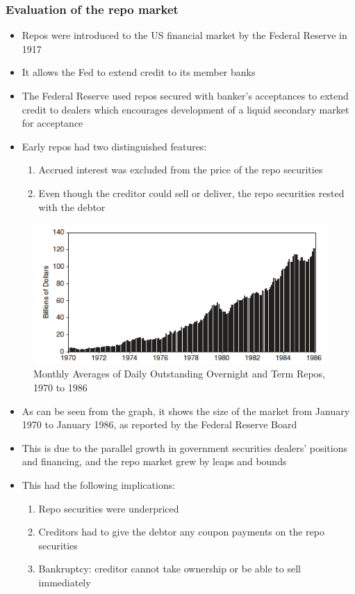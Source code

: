 \documentclass[11pt]{beamer}
\begin{document}
\begin{frame}
\frametitle{Evaluation of the repo market}
\begin{itemize}
\item Repos were introduced to the US financial market by the Federal Reserve in 1917
\item It allows the Fed to extend credit to its member banks
\item The Federal Reserve used repos secured with banker's acceptances to extend credit to dealers which encourages development of a liquid secondary market for acceptance
\item Early repos had two distinguished features:
\begin{enumerate}
\item Accrued interest was excluded from the price of the repo securities
\item Even though the creditor could sell or deliver, the repo securities rested with the debtor
\end{enumerate}
\end{itemize}
\end{frame}

\begin{frame}
\begin{figure}
\includegraphics[width=\textwidth]{11_1.png}
\caption{Monthly Averages of Daily Outstanding Overnight and Term Repos, 1970 to 1986}
\end{figure}
\end{frame}

\begin{frame}
\begin{itemize}
\item As can be seen from the graph, it shows the size of the market from January 1970 to January 1986, as reported by the Federal Reserve Board
\item This is due to the parallel growth in government securities dealers’ positions and financing, and the repo market grew by leaps and bounds
\item This had the following implications:
\begin{enumerate}
\item Repo securities were underpriced
\item Creditors had to give the debtor any coupon payments on the repo securities
\item Bankruptcy: creditor cannot take ownership or be able to sell immediately
\end{enumerate}
\end{itemize}
\end{frame}
\end{document}
